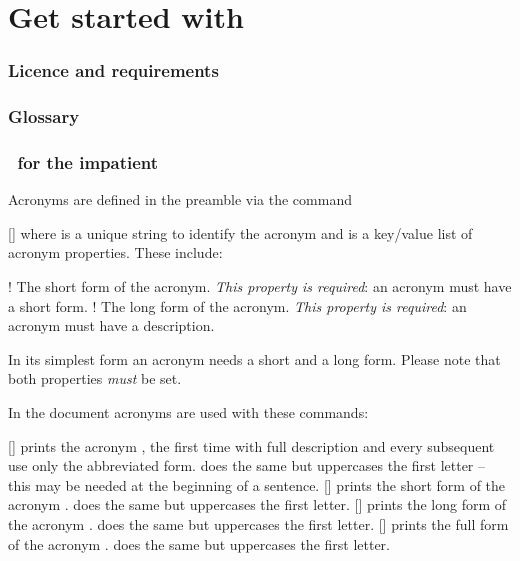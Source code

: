 \documentclass{acro-manual}
\begin{document}
\clearpage
\part{Get started with \acro}\label{part:get-started-with}

\section{Licence and requirements}\label{sec:licence-requirements}
\license

\section{Glossary}
\printacronyms[include=glossary,template=glossary]

\section{\acro\ for the impatient}\label{sec:acro-impatient}

Acronyms are defined in the preamble via the command
\begin{commands}
  []
    where  is a unique string to identify the acronym and
     is a key\slash value list of acronym properties.  These
    include:
\end{commands}
\begin{properties}
  \Default!
    The short form of the acronym.  \emph{This property is required}: an
    acronym must have a short form.
  \Default!
    The long form of the acronym.  \emph{This property is required}: an
    acronym must have a description.
\end{properties}
\begin{bewareofthedog}
  In its simplest form an acronym needs a short and a long form.  Please note
  that both properties \emph{must} be set.
\end{bewareofthedog}  

In the document acronyms are used with these commands:
\begin{commands}
  [\quad{}]
     prints the acronym , the first time with full description
    and every subsequent use only the abbreviated form.  does the same
    but uppercases the first letter -- this may be needed at the beginning of
    a sentence.
  [\quad{}]
     prints the short form of the acronym .  does the
    same but uppercases the first letter.
  [\quad{}]
     prints the long form of the acronym .  does the
    same but uppercases the first letter.
  [\quad{}]
     prints the full form of the acronym .  does the
    same but uppercases the first letter.
\end{commands}
\end{document}
